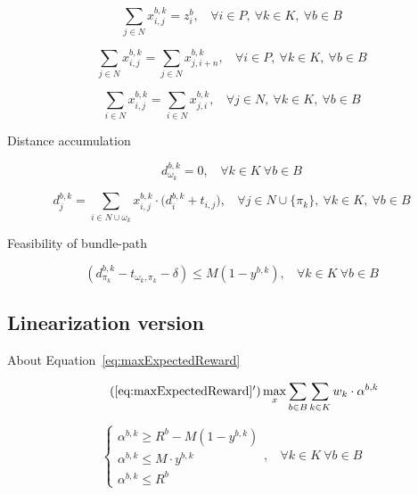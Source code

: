 \documentclass[12pt ]{article}
\begin{document}
\begin{equation}
	\sum_{ j \in N } x_{i,j}^{b,k} = z_{i}^{b},~~~~\forall i \in P,~\forall k \in K,~\forall b \in B
	\label{eq:taskMembership_flowEnforcement}
\end{equation}

\begin{equation}
	\sum_{ j \in N } x_{i,j}^{b,k} = \sum_{ j \in N } x_{j,i+n}^{b,k},~~~~\forall i \in P,~\forall k \in K,~\forall b \in B
	\label{eq:pickupDeliveryConservation}
\end{equation}

\begin{equation}
	\sum_{ i \in N} x_{i,j}^{b,k} = \sum_{ i \in N} x_{j,i}^{b,k},~~~~\forall j \in N,~\forall k \in K,~\forall b \in B
	\label{eq:flowConservation}
\end{equation}


Distance accumulation

\begin{equation}
	d_{\omega_k}^{b,k} = 0,~~~~\forall k \in K~\forall b \in B
	\label{eq:initBeginningDistance}
\end{equation}

\begin{equation}
	d_{j}^{b,k} = \sum_{ i \in N \cup \omega_k} x_{i,j}^{b,k} \cdot \big( d_i^{b,k} + t_{i,j} \big),~~~~\forall j \in N \cup \{ \pi_{k} \},~\forall k \in K,~\forall b \in B
	\label{eq:calcAccumulatedDistance}
\end{equation}

Feasibility of bundle-path

\begin{equation} 
	(d_{\pi_k}^{b, k} - t_{\omega_k, \pi_k} - \delta) \le M (1 - y^{b, k}),~~~~\forall k \in K~\forall b \in B
	\label{eq:accumulatedDistanceFeasibility}
\end{equation}


\subsection{Linearization version}

About Equation~\ref{eq:maxExpectedReward}

\begin{equation} \tag{\ref{eq:maxExpectedReward}$^\prime$}
	\max_x \sum_{ b \in B} \sum_{k \in K} w_k \cdot \alpha^{b,k}
	\label{eq:maxExpectedReward_linearization}
\end{equation}

\begin{equation}
	\begin{cases} 
      	\alpha^{b,k} \ge R^b - M ( 1 - y^{b,k} ) \\
      	\alpha^{b,k} \le M \cdot y^{b,k} \\
      	\alpha^{b,k} \le R^b
   	\end{cases}
   	,~~~~\forall k \in K~\forall b \in B
\label{eq:linearization_alpha}
\end{equation}
\end{document}
